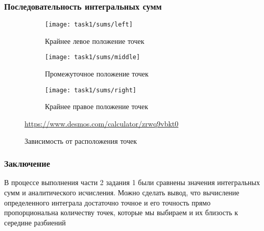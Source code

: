 \subsubsection*{Последовательность интегральных сумм}
\begin{figure}[H]
	\centering
	\begin{subfigure}{0.3\textwidth}
		\centering
		\texttt{[image: task1/sums/left]}\quad
		\caption*{Крайнее левое положение точек}
	\end{subfigure}
	\begin{subfigure}{0.3\textwidth}
		\centering
		\texttt{[image: task1/sums/middle]}\quad
		\caption*{Промежуточное положение точек}
	\end{subfigure}
	\begin{subfigure}{0.3\textwidth}
		\centering
		\texttt{[image: task1/sums/right]}\quad
		\caption*{Крайнее правое положение точек}
	\end{subfigure}
	\caption{Зависимость от расположения точек}
	\url{https://www.desmos.com/calculator/zrwq9vbkt0}
\end{figure}
\subsubsection{Заключение}
В процессе выполнения части 2 задания 1 были сравнены значения интегральных сумм и аналитического исчисления. Можно сделать вывод, что вычисление определенного интеграла достаточно точное и его точность прямо пропорциональна количеству точек, которые мы выбираем и их близость к середине разбиений



